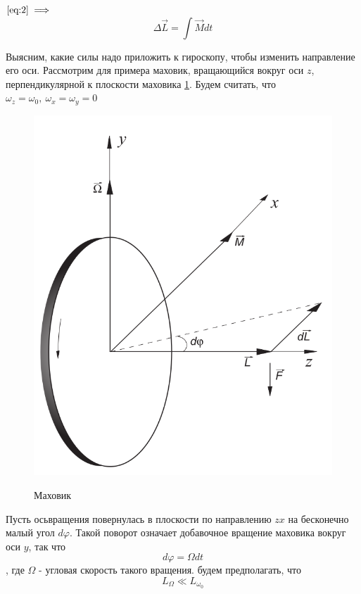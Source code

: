 \documentclass[a4paper,12pt]{article} %
\begin{document}
$\eqref{eq:2} \implies$
\begin {equation} \Delta \vec{L} = \int{\vec{M} dt}  \label{eq:4} \end{equation}

Выясним, какие силы надо приложить к гироскопу, чтобы изменить направление его оси. Рассмотрим для примера маховик, вращающийся вокруг оси $z$, перпендикулярной к плоскости маховика \ref{pic:1}.
Будем считать, что $\omega_z = \omega_0,\ \omega_x = \omega_y = 0$
\begin {figure} [H] \includegraphics[scale=0.3]{./data/рис 1.png} \label{pic:1} \caption[Рис. 1]{Маховик} \end{figure}

Пусть осьвращения повернулась в плоскости по направлению $zx$ на бесконечно малый угол $d\varphi$. Такой поворот означает добавочное вращение маховика вокруг оси $y$, так что \[d\varphi = \Omega dt\], где $\Omega$ - угловая скорость такого вращения. будем предполагать, что
\begin {equation} L_\Omega \ll L_{\omega_0} \label{eq:5} \end {equation}
\end{document}
